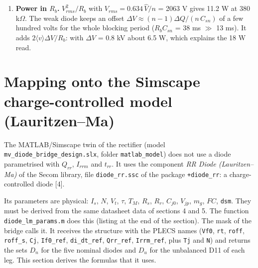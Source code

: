 \documentclass[11pt,a4paper,numbers=noenddot]{scrartcl}
\begin{document}
\begin{onehalfspace}
\begin{enumerate}
  \[P_{R_{sn}} \approx I_{50}^2 R_{sn} + f \left[ \frac{1}{2}\frac{C_{sn}}{n}\frac{V_0^2}{n} + \frac{1}{2}(2L_c)\frac{I_{rrm}^2}{n} \right] = 0.8 + 50\,[0.062 + 0.36] \approx 22\ \text{W}, \tag{6.1}\]

  where \(I_{50}\) = 58 mA is the mains-frequency current in \(C_{sn}\). The second term is the charging of the stack to \(V_0\) at every turn-off (it does not depend on \(R_{sn}\)). The third term is the energy of the commutation loop at the moment of snap-off, shared between the six resistors. The unbalance adds about \(\Delta Q \cdot \hat v\) on the first diode, that is 4--8 W for \(u\) = 0.3. The 26 W read in the simulation are consistent.
\item
  \textbf{Power in \(R_b\).} \(V_{rms}^2/R_b\) with \(V_{rms} = 0.634\,\hat V/n\) = 2063 V gives 11.2 W at 380 k\(\Omega\). The weak diode keeps an offset \(\Delta V \approx (n-1)\Delta Q/(n\,C_{sn})\) of a few hundred volts for the whole blocking period (\(R_b C_{sn}\) = 38 ms \(\gg\) 13 ms). It adds \(2\langle v\rangle \Delta V / R_b\): with \(\Delta V\) = 0.8 kV about 6.5 W, which explains the 18 W read.
\end{enumerate}

\section{Mapping onto the Simscape charge-controlled model (Lauritzen--Ma)}\label{mapping-onto-the-simscape-charge-controlled-model-lauritzenma}

The MATLAB/Simscape twin of the rectifier (model \texttt{mv\_\allowbreak{}diode\_\allowbreak{}bridge\_\allowbreak{}design.slx}, folder \texttt{matlab\_model}) does not use a diode parametrised with \(Q_{rr}\), \(I_{rrm}\) and \(t_{rr}\). It uses the component \emph{RR Diode (Lauritzen--Ma)} of the Secom library, file \texttt{diode\_rr.ssc} of the package \texttt{+diode\_rr}: a charge-controlled diode {[}4{]}.

Its parameters are physical: \(I_s\), \(N\), \(V_t\), \(\tau\), \(T_M\), \(R_s\), \(R_r\), \(C_{j0}\), \(V_{jp}\), \(m_g\), \(FC\), \texttt{dsm}. They must be derived from the same datasheet data of sections 4 and 5. The function \texttt{diode\_lm\_params.m} does this (listing at the end of the section). The mask of the bridge calls it. It receives the structure with the PLECS names (\texttt{Vf0}, \texttt{rt}, \texttt{roff}, \texttt{roff\_s}, \texttt{Cj}, \texttt{If0\_ref}, \texttt{di\_dt\_ref}, \texttt{Qrr\_ref}, \texttt{Irrm\_ref}, plus \texttt{Tj} and \texttt{N}) and returns the sets \(D_n\) for the five nominal diodes and \(D_u\) for the unbalanced D11 of each leg. This section derives the formulas that it uses.


\end{onehalfspace}
\end{document}

